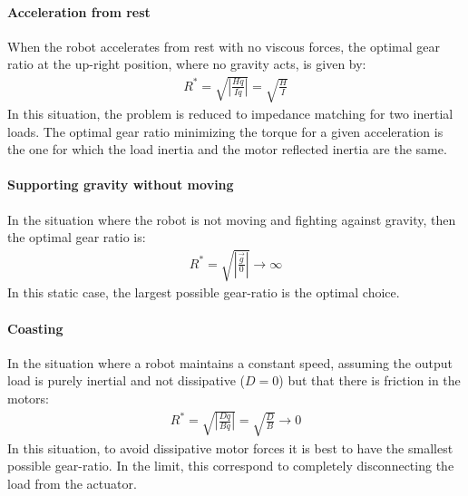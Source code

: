 \paragraph{Acceleration from rest} 

When the robot accelerates from rest with no viscous forces, the optimal gear ratio at the up-right position, where no gravity acts, is given by:
\begin{align}
	R^{*}  = \sqrt{ \left | \frac{H \ddot{q} }{ I \ddot{q} } \right |   } = \sqrt{ \frac{H}{I}}
 \label{eq:impmatching}
\end{align}
In this situation, the problem is reduced to impedance matching for two inertial loads. The optimal gear ratio minimizing the torque for a given acceleration is the one for which the load inertia and the motor reflected inertia are the same.

\paragraph{Supporting gravity without moving}

In the situation where the robot is not moving and fighting against gravity, then the optimal gear ratio is:
\begin{align}
	R^{*}  = \sqrt{ \left | \frac{ \vec{g} }{ 0 } \right |   } \rightarrow \infty
 \label{eq:gravrejection}
\end{align}
In this static case, the largest possible gear-ratio is the optimal choice. 


\paragraph{Coasting} 

In the situation where a robot maintains a constant speed, assuming the output load is purely inertial and not dissipative ($D=0$) but that there is friction in the motors:
%
\begin{align}
	R^{*}  = \sqrt{ \left | \frac{D \dot{q} }{ B \dot{q} } \right |   } = \sqrt{ \frac{D}{B}} \rightarrow 0
 \label{eq:impmatching}
\end{align}
%
In this situation, to avoid dissipative motor forces it is best to have the smallest possible gear-ratio. In the limit, this correspond to completely disconnecting the load from the actuator.




